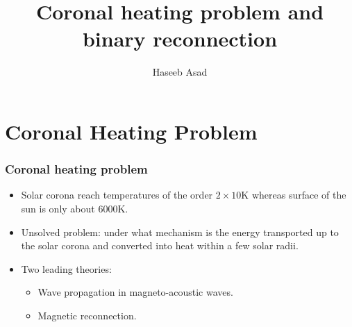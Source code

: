 \documentclass{beamer}
\title[Short Title]{%
    Coronal heating problem and binary reconnection
    \vspace{0.5cm}
}
\author{Haseeb Asad}
\institute{
        \textit{Department of Mathematics}\\
        \textit{Durham University}
        \vspace{0.5cm}
}
\date[Venue and Date]{%
    
}
\begin{document}

{
    \maketitle
}

\section{Coronal Heating Problem}
\begin{frame}
    \frametitle{Coronal heating problem}
    \small
    \begin{itemize}
        \item Solar corona reach temperatures of the order $2 \times 10 \text{K}$ whereas surface of the sun is only about $6000\text{K}$.
        \item Unsolved problem: under what mechanism is the energy transported up to the solar corona and converted into heat within a few solar radii.
        \item Two leading theories:
        \begin{itemize}
            \item Wave propagation in magneto-acoustic waves.
            \item Magnetic reconnection.
        \end{itemize}
    \end{itemize}
\end{frame}


\end{document}
